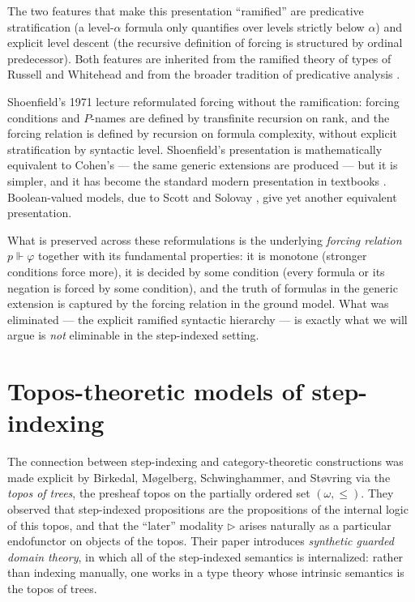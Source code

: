 \documentclass[11pt]{article}
\begin{document}
The two features that make this presentation ``ramified'' are
predicative stratification (a level-$\alpha$ formula only quantifies
over levels strictly below $\alpha$) and explicit level descent (the
recursive definition of forcing is structured by ordinal predecessor).
Both features are inherited from the ramified theory of types of
Russell and Whitehead \cite{russell-whitehead-PM} and from the broader
tradition of predicative analysis \cite{weyl1918,feferman1998}.

Shoenfield's 1971 lecture \cite{shoenfield1971} reformulated forcing
without the ramification: forcing conditions and $P$-names are
defined by transfinite recursion on rank, and the forcing relation is
defined by recursion on formula complexity, without explicit
stratification by syntactic level. Shoenfield's presentation is
mathematically equivalent to Cohen's --- the same generic extensions
are produced --- but it is simpler, and it has become the standard
modern presentation in textbooks \cite{kunen2011,jech2003}.
Boolean-valued models, due to Scott and Solovay
\cite{scott-solovay1967}, give yet another equivalent presentation.

What is preserved across these reformulations is the underlying
\emph{forcing relation} $p \Vdash \varphi$ together with its
fundamental properties: it is monotone (stronger conditions force
more), it is decided by some condition (every formula or its negation
is forced by some condition), and the truth of formulas in the
generic extension is captured by the forcing relation in the ground
model. What was eliminated --- the explicit ramified syntactic
hierarchy --- is exactly what we will argue is \emph{not}
eliminable in the step-indexed setting.

\section{Topos-theoretic models of step-indexing}
\label{sec:topos}

The connection between step-indexing and category-theoretic
constructions was made explicit by Birkedal, Møgelberg,
Schwinghammer, and Støvring \cite{birkedal-et-al-2012} via the
\emph{topos of trees}, the presheaf topos on the partially ordered
set $(\omega, \le)$. They observed that step-indexed propositions are
the propositions of the internal logic of this topos, and that the
``later'' modality $\triangleright$ arises naturally as a particular
endofunctor on objects of the topos. Their paper introduces
\emph{synthetic guarded domain theory}, in which all of the
step-indexed semantics is internalized: rather than indexing
manually, one works in a type theory whose intrinsic semantics is the
topos of trees.
\end{document}
